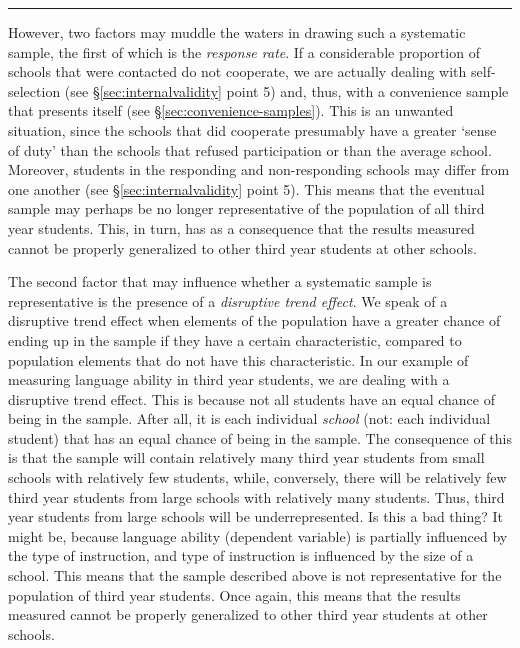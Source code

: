 \documentclass[
]{book}
\begin{document}
\begin{center}\rule{0.5\linewidth}{0.5pt}\end{center}

However, two factors may muddle the waters in drawing such a systematic sample, the first of which is the \emph{response rate}. If a considerable proportion of schools that were contacted do not cooperate, we are actually dealing with self-selection (see §\ref{sec:internalvalidity} point 5) and, thus, with a convenience sample that presents itself (see §\ref{sec:convenience-samples}). This is an unwanted situation, since the schools that did cooperate presumably have a greater `sense of duty' than the schools that refused participation or than the average school. Moreover, students in the responding and non-responding schools may differ from one another (see §\ref{sec:internalvalidity} point 5). This means that the eventual sample may perhaps be no longer representative of the population of all third year students. This, in turn, has as a consequence that the results measured cannot be properly generalized to other third year students at other schools.

The second factor that may influence whether a systematic sample is representative is the presence of a \emph{disruptive trend effect}. We speak of a disruptive trend effect when elements of the population have a greater chance of ending up in the sample if they have a certain characteristic, compared to population elements that do not have this characteristic. In our example of measuring language ability in third year students, we are dealing with a disruptive trend effect. This is because not all students have an equal chance of being in the sample. After all, it is each individual \emph{school} (not: each individual student) that has an equal chance of being in the sample. The consequence of this is that the sample will contain relatively many third year students from small schools with relatively few students, while, conversely, there will be relatively few third year students from large schools with relatively many students. Thus, third year students from large schools will be underrepresented. Is this a bad thing? It might be, because language ability (dependent variable) is partially influenced by the type of instruction, and type of instruction is influenced by the size of a school. This means that the sample described above is not representative for the population of third year students. Once again, this means that the results measured cannot be properly generalized to other third year students at other schools.
\end{document}
